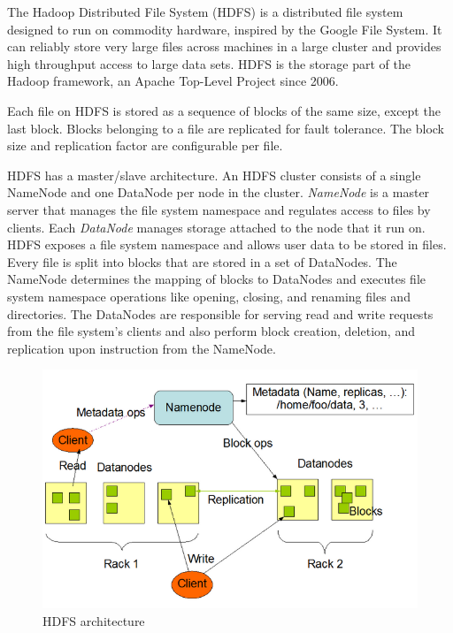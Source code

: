 The Hadoop Distributed File System (HDFS) is a distributed file system designed to run on commodity hardware, inspired by the Google File System. It can reliably store very large files across machines in a large cluster and provides high throughput access to large data sets. HDFS is the storage part of the Hadoop framework, an Apache Top-Level Project since 2006.

Each file on HDFS is stored as a sequence of blocks of the same size, except the last block. Blocks belonging to a file are replicated for fault tolerance. The block size and replication factor are configurable per file.

HDFS has a master/slave architecture. An HDFS cluster consists of a single NameNode and one DataNode per node in the cluster. \emph{NameNode} is a master server that manages the file system namespace and regulates access to files by clients. Each \emph{DataNode} manages storage attached to the node that it run on. HDFS exposes a file system namespace and allows user data to be stored in files. Every file is split into blocks that are stored in a set of DataNodes. The NameNode determines the mapping of blocks to DataNodes and executes file system namespace operations like opening, closing, and renaming files and directories. The DataNodes are responsible for serving read and write requests from the file system’s clients and also perform block creation, deletion, and replication upon instruction from the NameNode.

\begin{figure}[H]
\centering
\includegraphics[width=1\textwidth]{figures/hdfs_architecture}
\caption{HDFS architecture}
\label{figure:hdfs_architecture}
\end{figure}

